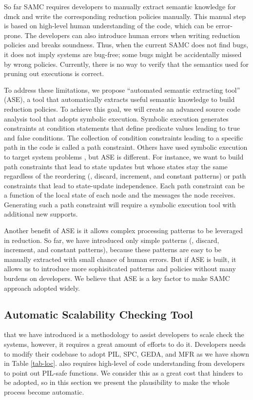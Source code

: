 So far SAMC requires developers to manually extract semantic knowledge for dmck
and write the corresponding reduction policies manually. This manual step is
based on high-level human understanding of the code, which can be error-prone.
The developers can also introduce human errors when writing reduction policies
and breaks soundness. Thus, when the current SAMC does not find bugs, it does
not imply systems are bug-free; some bugs might be accidentally missed by wrong
policies. Currently, there is no way to verify that the semantics used for
pruning out executions is correct.

To address these limitations, we propose ``automated semantic extracting tool''
(ASE), a tool that automatically extracts useful semantic knowledge to build
reduction policies. To achieve this goal, we will create an advanced source code
analysis tool that adopts symbolic execution. Symbolic execution generates
constraints at condition statements that define predicate values leading to true
and false conditions. The collection of condition constraints leading to a
specific path in the code is called a path constraint. Others have used symbolic
execution to target system problems \cite{Bucur+14-SymbolicExecution}, but ASE
is different. For instance, we want to build path constraints that lead to state
updates but whose states stay the same regardless of the reordering (\eg,
discard, increment, and constant patterns) or path constraints that lead to
state-update independence. Each path constraint can be a function of the local
state of each node and the messages the node receives. Generating such a path
constraint will require a symbolic execution tool with additional new supports.

Another benefit of ASE is it allows complex processing patterns to be leveraged
in reduction. So far, we have introduced only simple patterns (\eg, discard,
increment, and constant patterns), because these patterns are easy to be
manually extracted with small chance of human errors. But if ASE is built, it
allows us to introduce more sophisitcated patterns and policies without many
burdens on developers. We believe that ASE is a key factor to make SAMC approach
adopted widely.

\subsection{Automatic Scalability Checking Tool}

\sck that we have introduced is a methodology to assist developers to scale
check the systems, however, it requires a great amount of efforts to do it. 
Developers needs to modify their codebase to adopt PIL, SPC, GEDA, and MFR as we
have shown in Table \ref{tab-loc}. \sck also requires high-level of code
understanding from developers to point out PIL-safe functions. We consider this
as a great cost that hinders \sck to be adopted, so in this section we present
the plausibility to make the whole process become automatic.


